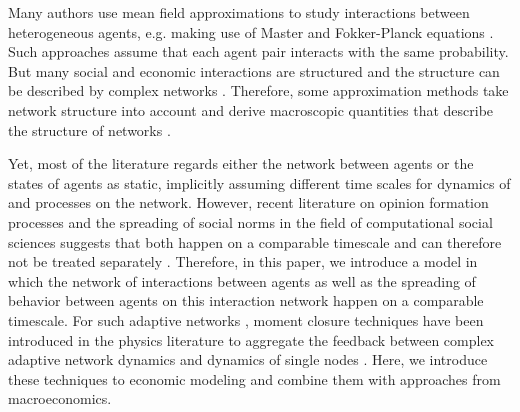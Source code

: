 

Many authors use mean field approximations to study interactions between heterogeneous agents, e.g. making use of Master and Fokker-Planck equations \citep{Aoki1998, Aoki2007, DelliGatti2000, DiGuilmi2008, Chiarella2011a, Landini2014}. Such approaches assume that each agent pair interacts with the same probability.
But many social and economic interactions are structured and the structure can be described by complex networks \citep{Friedkin2011}. Therefore, some approximation methods take network structure into account and derive macroscopic quantities that describe the structure of networks \citep[e.g.][]{Alfarano2008a, Lux2016}.

Yet, most of the literature regards either the network between agents or the states of agents as static, implicitly assuming different time scales for dynamics of and processes on the network.
However, recent literature on opinion formation processes and the spreading of social norms in the field of computational social sciences suggests that both happen on a comparable timescale and can therefore not be treated separately \citep{Gross2008, gross2009adaptive}.
Therefore, in this paper, we introduce a model in which the network of interactions between agents as well as the spreading of behavior between agents on this interaction network happen on a comparable timescale.
For such adaptive networks \citep{Gross2008}, moment closure techniques have been introduced in the physics literature to aggregate the feedback between complex adaptive network dynamics and dynamics of single nodes \citep{Do2009, Demirel2014, Wiedermann2015}.
Here, we introduce these techniques to economic modeling and combine them with approaches from macroeconomics.

